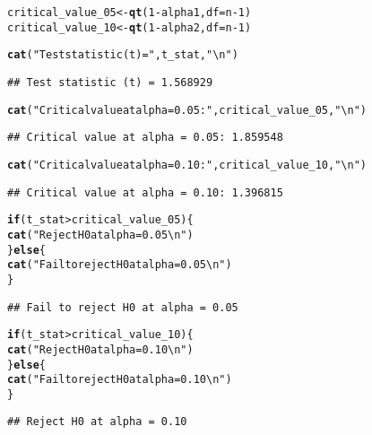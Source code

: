 \documentclass{article}\usepackage[]{graphicx}\usepackage[]{xcolor}
\makeatletter
\newcommand{\hlnum}[1]{\textcolor[rgb]{0.686,0.059,0.569}{#1}}%
\newcommand{\hlsng}[1]{\textcolor[rgb]{0.192,0.494,0.8}{#1}}%
\newcommand{\hlopt}[1]{\textcolor[rgb]{0,0,0}{#1}}%
\newcommand{\hldef}[1]{\textcolor[rgb]{0.345,0.345,0.345}{#1}}%
\newcommand{\hlkwa}[1]{\textcolor[rgb]{0.161,0.373,0.58}{\textbf{#1}}}%
\newcommand{\hlkwb}[1]{\textcolor[rgb]{0.69,0.353,0.396}{#1}}%
\newcommand{\hlkwc}[1]{\textcolor[rgb]{0.333,0.667,0.333}{#1}}%
\newcommand{\hlkwd}[1]{\textcolor[rgb]{0.737,0.353,0.396}{\textbf{#1}}}%
\newenvironment{kframe}{%
 \def\at@end@of@kframe{}%
 \ifinner\ifhmode%
  \def\at@end@of@kframe{\end{minipage}}%
  \begin{minipage}{\columnwidth}%
 \fi\fi%
 \def\FrameCommand##1{\hskip\@totalleftmargin \hskip-\fboxsep
 \colorbox{shadecolor}{##1}\hskip-\fboxsep
     \hskip-\linewidth \hskip-\@totalleftmargin \hskip\columnwidth}%
 \MakeFramed {\advance\hsize-\width
   \@totalleftmargin\z@ \linewidth\hsize
   \@setminipage}}%
 {\par\unskip\endMakeFramed%
 \at@end@of@kframe}
\newenvironment{knitrout}{}{} %
\makeatother
\begin{document}
\begin{knitrout}
\begin{kframe}
\begin{alltt}
\hldef{critical_value_05} \hlkwb{<-} \hlkwd{qt}\hldef{(}\hlnum{1} \hlopt{-} \hldef{alpha1,} \hlkwc{df} \hldef{= n}\hlopt{-}\hlnum{1}\hldef{)}
\hldef{critical_value_10} \hlkwb{<-} \hlkwd{qt}\hldef{(}\hlnum{1} \hlopt{-} \hldef{alpha2,} \hlkwc{df} \hldef{= n}\hlopt{-}\hlnum{1}\hldef{)}

\hlkwd{cat}\hldef{(}\hlsng{"Test statistic (t) ="}\hldef{, t_stat,} \hlsng{"\textbackslash{}n"}\hldef{)}
\end{alltt}
\begin{verbatim}
## Test statistic (t) = 1.568929
\end{verbatim}
\begin{alltt}
\hlkwd{cat}\hldef{(}\hlsng{"Critical value at alpha = 0.05:"}\hldef{, critical_value_05,} \hlsng{"\textbackslash{}n"}\hldef{)}
\end{alltt}
\begin{verbatim}
## Critical value at alpha = 0.05: 1.859548
\end{verbatim}
\begin{alltt}
\hlkwd{cat}\hldef{(}\hlsng{"Critical value at alpha = 0.10:"}\hldef{, critical_value_10,} \hlsng{"\textbackslash{}n"}\hldef{)}
\end{alltt}
\begin{verbatim}
## Critical value at alpha = 0.10: 1.396815
\end{verbatim}
\begin{alltt}
\hlkwa{if} \hldef{(t_stat} \hlopt{>} \hldef{critical_value_05) \{}
  \hlkwd{cat}\hldef{(}\hlsng{"Reject H0 at alpha = 0.05\textbackslash{}n"}\hldef{)}
\hldef{\}} \hlkwa{else} \hldef{\{}
  \hlkwd{cat}\hldef{(}\hlsng{"Fail to reject H0 at alpha = 0.05\textbackslash{}n"}\hldef{)}
\hldef{\}}
\end{alltt}
\begin{verbatim}
## Fail to reject H0 at alpha = 0.05
\end{verbatim}
\begin{alltt}
\hlkwa{if} \hldef{(t_stat} \hlopt{>} \hldef{critical_value_10) \{}
  \hlkwd{cat}\hldef{(}\hlsng{"Reject H0 at alpha = 0.10\textbackslash{}n"}\hldef{)}
\hldef{\}} \hlkwa{else} \hldef{\{}
  \hlkwd{cat}\hldef{(}\hlsng{"Fail to reject H0 at alpha = 0.10\textbackslash{}n"}\hldef{)}
\hldef{\}}
\end{alltt}
\begin{verbatim}
## Reject H0 at alpha = 0.10
\end{verbatim}
\end{kframe}
\end{knitrout}
\end{document}
